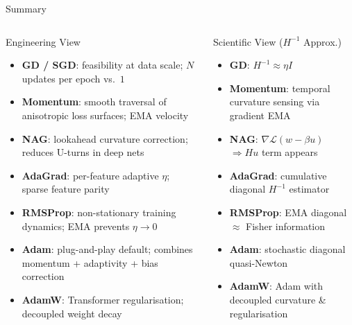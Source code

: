\documentclass{beamer}
\begin{document}
\begin{frame}[shrink=10]{Summary}
  \begin{columns}[T]
    \begin{block}{Engineering View}
      \begin{itemize}\setlength\itemsep{4pt}
        \item \textbf{GD / SGD}: feasibility at data scale;
              $N$ updates per epoch vs.\ $1$
        \item \textbf{Momentum}: smooth traversal of anisotropic
              loss surfaces; EMA velocity
        \item \textbf{NAG}: lookahead curvature correction;
              reduces U-turns in deep nets
        \item \textbf{AdaGrad}: per-feature adaptive $\eta$;
              sparse feature parity
        \item \textbf{RMSProp}: non-stationary training dynamics;
              EMA prevents $\eta\!\to 0$
        \item \textbf{Adam}: plug-and-play default; combines
              momentum + adaptivity + bias correction
        \item \textbf{AdamW}: Transformer regularisation;
              decoupled weight decay
      \end{itemize}
    \end{block}

    \begin{block}{Scientific View ($H^{-1}$ Approx.)}
      \begin{itemize}\setlength\itemsep{4pt}
        \item \textbf{GD}: $H^{-1}\approx\eta I$
        \item \textbf{Momentum}: temporal curvature
              sensing via gradient EMA
        \item \textbf{NAG}: $\nabla\mathcal{L}(w-\beta u)$
              $\Rightarrow Hu$ term appears
        \item \textbf{AdaGrad}: cumulative diagonal
              $H^{-1}$ estimator
        \item \textbf{RMSProp}: EMA diagonal
              $\approx$ Fisher information
        \item \textbf{Adam}: stochastic diagonal
              quasi-Newton
        \item \textbf{AdamW}: Adam with decoupled
              curvature \& regularisation
      \end{itemize}
    \end{block}
  \end{columns}


\end{frame}
\end{document}
